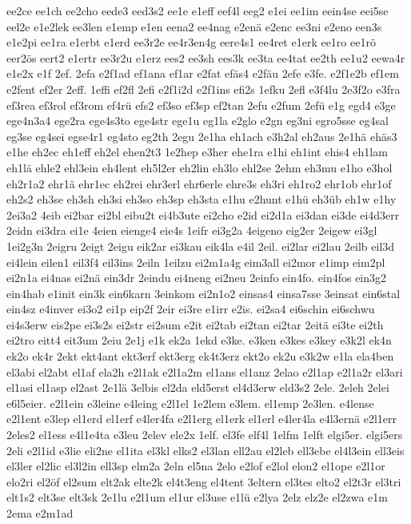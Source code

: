 {ee2ce
ee1ch
ee2cho
eede3
eed3s2
ee1e
e1eff
eef4l
eeg2
e1ei
ee1im
eein4se
eei5se
eel2e
e1e2lek
ee3len
e1emp
e1en
eena2
ee4nag
e2enä
e2enc
ee3ni
e2eno
een3s
e1e2pi
ee1ra
e1erbt
e1erd
ee3r2e
ee4r3en4g
eere4s1
ee4ret
e1erk
ee1ro
ee1rö
eer2ös
eert2
e1ertr
ee3r2u
e1erz
ees2
ee3sh
ees3k
ee3ta
ee4tat
ee2th
ee1u2
eewa4r
e1e2x
e1f
2ef.
2efa
e2f1ad
ef1ana
ef1ar
e2fat
efäs4
e2fäu
2efe
e3fe.
e2f1e2b
ef1em
e2fent
ef2er
2eff.
1effi
ef2fl
2efi
e2f1i2d
e2f1ins
efi2s
1efku
2efl
e3f4lu
2e3f2o
e3fra
ef3rea
ef3rol
ef3rom
ef4rü
efs2
ef3so
ef3sp
ef2tan
2efu
e2fum
2efü
e1g
egd4
e3ge
ege4n3a4
ege2ra
ege4s3to
ege4str
ege1u
eg1la
e2glo
e2gn
eg3ni
egro5sse
eg4sal
eg3se
eg4sei
egse4r1
eg4sto
eg2th
2egu
2e1ha
eh1ach
e3h2al
eh2aus
2e1hä
ehäs3
e1he
eh2ec
eh1eff
eh2el
ehen2t3
1e2hep
e3her
ehe1ra
e1hi
eh1int
ehis4
eh1lam
eh1lä
ehle2
ehl3ein
eh4lent
eh5l2er
eh2lin
eh3lo
ehl2se
2ehm
eh3mu
e1ho
e3hol
eh2r1a2
ehr1ä
ehr1ec
eh2rei
ehr3erl
ehr6erle
ehre3s
eh3ri
eh1ro2
ehr1ob
ehr1of
eh2s2
eh3se
eh3sh
eh3si
eh3so
eh3sp
eh3sta
e1hu
e2hunt
e1hü
eh3üb
eh1w
e1hy
2ei3a2
4eib
ei2bar
ei2bl
eibu2t
ei4b3ute
ei2cho
e2id
ei2d1a
ei3dan
ei3de
ei4d3err
2eidn
ei3dra
ei1e
4eien
eienge4
eie4s
1eifr
ei3g2a
4eigeno
eig2er
2eigew
ei3gl
1ei2g3n
2eigru
2eigt
2eigu
eik2ar
ei3kau
eik4la
e4il
2eil.
ei2lar
ei2lau
2eilb
eil3d
ei4lein
eilen1
eil3f4
eil3ins
2eiln
1eilzu
ei2m1a4g
eim3all
ei2mor
e1imp
eim2pl
ei2n1a
ei4nas
ei2nä
ein3dr
2eindu
ei4neng
ei2neu
2einfo
ein4fo.
ein4fos
ein3g2
ein4hab
e1init
ein3k
ein6karn
3einkom
ei2n1o2
einsas4
einsa7sse
3einsat
ein6stal
ein4sz
e4inver
ei3o2
ei1p
eip2f
2eir
ei3re
e1irr
e2is.
ei2sa4
ei6schin
ei6schwu
ei4s3erw
eis2pe
ei3s2s
ei2str
ei2sum
e2it
ei2tab
ei2tan
ei2tar
2eitä
ei3te
ei2th
ei2tro
eitt4
eit3um
2eiu
2e1j
e1k
ek2a
1ekd
e3ke.
e3ken
e3kes
e3key
e3k2l
ek4n
ek2o
ek4r
2ekt
ekt4ant
ekt3erf
ekt3erg
ek4t3erz
ekt2o
ek2u
e3k2w
e1la
ela4ben
el3abi
el2abt
el1af
ela2h
e2l1ak
e2l1a2m
el1ans
el1anz
2elao
e2l1ap
e2l1a2r
el3ari
el1asi
el1asp
el2ast
2e1lä
3elbis
el2da
eld5erst
el4d3erw
eld3s2
2ele.
2eleh
2elei
e6l5eier.
e2l1ein
e3leine
e4leing
e2l1el
1e2lem
e3lem.
el1emp
2e3len.
e4lense
e2l1ent
e3lep
el1erd
el1erf
e4ler4fa
e2l1erg
el1erk
el1erl
e4ler4la
e4l3ernä
e2l1err
2eles2
el1ess
e4l1e4ta
e3leu
2elev
ele2x
1elf.
el3fe
elf4l
1elfm
1elft
elgi5er.
elgi5ers
2eli
e2l1id
e3lie
eli2ne
el1ita
el3kl
elks2
el3lan
ell2au
el2leb
ell3ebe
el4l3ein
ell3eis
el3ler
el2lic
el3l2in
ell3sp
elm2a
2eln
el5na
2elo
e2lof
e2lol
elon2
el1ope
e2l1or
elo2ri
el2öf
el2sum
elt2ak
elte2k
el4t3eng
el4tent
3eltern
el3tes
elto2
el2t3r
el3tri
elt1s2
elt3se
elt3sk
2e1lu
e2l1um
el1ur
el3use
e1lü
e2lya
2elz
elz2e
el2zwa
e1m
2ema
e2m1ad
}
